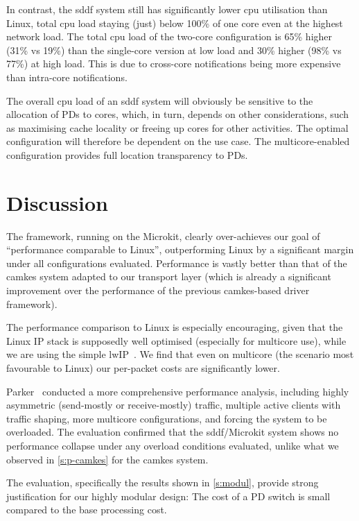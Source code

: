 \documentclass[a4paper,12pt]{report}
\begin{document}
In contrast, the \gls{sddf} system still has significantly lower \gls{cpu}
utilisation than Linux, total \gls{cpu} load staying (just) below 100\% of
one core even at the highest network load. The total \gls{cpu} load of the
two-core configuration is 65\% higher (31\% vs 19\%) than the
single-core version at low load and 30\% higher (98\% vs 77\%) at high
load. This is due to
cross-core notifications being more expensive than intra-core
notifications.

The overall \gls{cpu} load of an \gls{sddf} system will obviously be sensitive to
the allocation of PDs to cores, which, in turn, depends on other
considerations, such as maximising cache locality or freeing up cores
for other activities. The optimal configuration will therefore be
dependent on the use case. The multicore-enabled configuration
provides full location transparency to PDs.

\section{Discussion}\label{s:perf-disc}

The framework, running on the Microkit, clearly over-achieves our goal
of ``performance comparable to Linux'', outperforming Linux by a
significant margin under all configurations evaluated. Performance is vastly better than that
of the \gls{camkes} system adapted to our transport layer (which is already
a significant improvement over the performance of the previous \gls{camkes}-based
driver framework).

The performance comparison to Linux is especially encouraging, given
that the Linux IP stack is supposedly well optimised (especially for
multicore use), while we are using the simple
lwIP~\citep{Dunkels_01}. We find that even on multicore (the scenario
most favourable to Linux) our per-packet costs are significantly lower.

Parker~\citep{Parker:bsc} conducted a more comprehensive performance
analysis, including highly asymmetric (send-mostly or receive-mostly)
traffic, multiple active clients with traffic shaping, more multicore
configurations, and forcing the system to be overloaded.
The evaluation confirmed that the \gls{sddf}/Microkit system shows no
performance collapse under any overload conditions evaluated, unlike what we observed in
\autoref{s:p-camkes} for the \gls{camkes} system.

The evaluation, specifically the results shown in \autoref{s:modul},
provide strong justification for our highly modular design: The cost
of a PD switch is small compared to the base processing cost.
\end{document}
